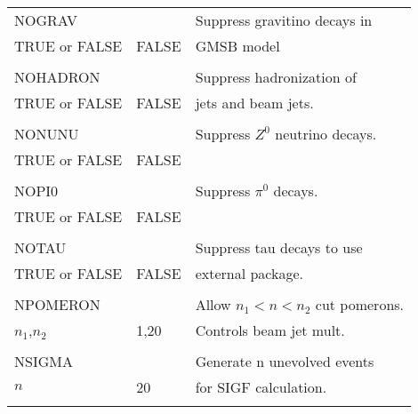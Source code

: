 \newpage
\begin{center}
\begin{tabular}{lll}
\hline\hline
NOGRAV                 &                   & Suppress gravitino decays in   \\
TRUE or FALSE          & FALSE             & GMSB model                     \\
                       &                   &                                \\
NOHADRON               &                   & Suppress hadronization of      \\
TRUE or FALSE          & FALSE             & jets and beam jets.            \\
                       &                   &                                \\
NONUNU                 &                   & Suppress $Z^0$ neutrino decays.\\
TRUE or FALSE          & FALSE             &                                \\
                       &                   &                                \\
NOPI0                  &                   &Suppress $\pi^0$ decays.        \\
TRUE or FALSE          & FALSE             &                                \\
                       &                   &                                \\
NOTAU                  &                   & Suppress tau decays to use     \\
TRUE or FALSE          & FALSE             & external package.              \\
                       &                   &                                \\
NPOMERON               &                   & Allow $n_1<n<n_2$ cut pomerons.\\
$n_1$,$n_2$            & 1,20              & Controls beam jet mult.        \\
                       &                   &                                \\
NSIGMA                 &                   & Generate n unevolved events    \\
$n$                    & 20                & for SIGF calculation.          \\
                       &                   &                                \\

\end{tabular}
\end{center}
